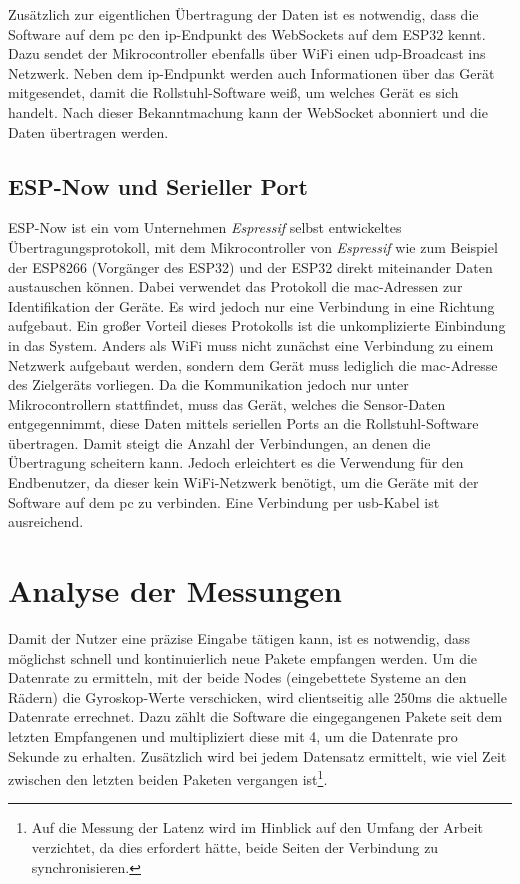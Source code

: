 Zusätzlich zur eigentlichen Übertragung der Daten ist es notwendig, dass die Software auf dem \ac{pc} den \ac{ip}-Endpunkt des WebSockets auf dem ESP32 kennt.
Dazu sendet der Mikrocontroller ebenfalls über WiFi einen \ac{udp}-Broadcast ins Netzwerk.
Neben dem \ac{ip}-Endpunkt werden auch Informationen über das Gerät mitgesendet, damit die Rollstuhl-Software weiß, um welches Gerät es sich handelt.
Nach dieser Bekanntmachung kann der WebSocket abonniert und die Daten übertragen werden.

\subsection{ESP-Now und Serieller Port}
ESP-Now ist ein vom Unternehmen \textit{Espressif} selbst entwickeltes Übertragungsprotokoll, mit dem Mikrocontroller von \textit{Espressif} wie zum Beispiel der ESP8266 (Vorgänger des ESP32) und der ESP32 direkt miteinander Daten austauschen können\cite{ESPNowUserGuide2016}.
Dabei verwendet das Protokoll die \ac{mac}-Adressen zur Identifikation der Geräte.
Es wird jedoch nur eine Verbindung in eine Richtung aufgebaut.
Ein großer Vorteil dieses Protokolls ist die unkomplizierte Einbindung in das System.
Anders als WiFi muss nicht zunächst eine Verbindung zu einem Netzwerk aufgebaut werden, sondern dem Gerät muss lediglich die \ac{mac}-Adresse des Zielgeräts vorliegen.
Da die Kommunikation jedoch nur unter Mikrocontrollern stattfindet, muss das Gerät, welches die Sensor-Daten entgegennimmt, diese Daten mittels seriellen Ports an die Rollstuhl-Software übertragen.
Damit steigt die Anzahl der Verbindungen, an denen die Übertragung scheitern kann.
Jedoch erleichtert es die Verwendung für den Endbenutzer, da dieser kein WiFi-Netzwerk benötigt, um die Geräte mit der Software auf dem \ac{pc} zu verbinden.
Eine Verbindung per \ac{usb}-Kabel ist ausreichend.

\section{Analyse der Messungen}
Damit der Nutzer eine präzise Eingabe tätigen kann, ist es notwendig, dass möglichst schnell und kontinuierlich neue Pakete empfangen werden.
Um die Datenrate zu ermitteln, mit der beide Nodes (eingebettete Systeme an den Rädern) die Gyroskop-Werte verschicken, wird clientseitig alle 250ms die aktuelle Datenrate errechnet.
Dazu zählt die Software die eingegangenen Pakete seit dem letzten Empfangenen und multipliziert diese mit 4, um die Datenrate pro Sekunde zu erhalten.
Zusätzlich wird bei jedem Datensatz ermittelt, wie viel Zeit zwischen den letzten beiden Paketen vergangen ist\footnote{Auf die Messung der Latenz wird im Hinblick auf den Umfang der Arbeit verzichtet, da dies erfordert hätte, beide Seiten der Verbindung zu synchronisieren.}.


